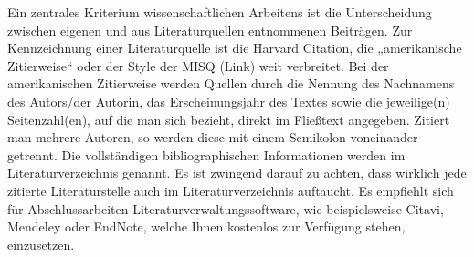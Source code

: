 \documentclass[12pt, oneside]{article}
\begin{document}
Ein zentrales Kriterium wissenschaftlichen Arbeitens ist die Unterscheidung zwischen eigenen und aus Literaturquellen entnommenen Beiträgen. Zur Kennzeichnung einer Literaturquelle ist die Harvard Citation, die „amerikanische Zitierweise“ oder der Style der MISQ (Link) weit verbreitet. Bei der amerikanischen Zitierweise werden Quellen durch die Nennung des Nachnamens des Autors/der Autorin, das Erscheinungsjahr des Textes sowie die jeweilige(n) Seitenzahl(en), auf die man sich bezieht, direkt im Fließtext angegeben. Zitiert man mehrere Autoren, so werden diese mit einem Semikolon voneinander getrennt. Die vollständigen bibliographischen Informationen werden im Literaturverzeichnis genannt. Es ist zwingend darauf zu achten, dass wirklich jede zitierte Literaturstelle auch im Literaturverzeichnis auftaucht. Es empfiehlt sich für Abschlussarbeiten Literaturverwaltungssoftware, wie beispielsweise Citavi, Mendeley oder EndNote, welche Ihnen kostenlos zur Verfügung stehen, einzusetzen.
\end{document}
